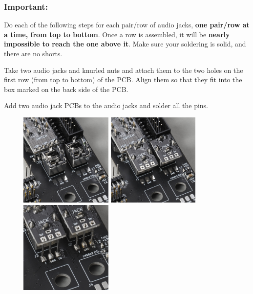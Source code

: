 \documentclass[12pt, a4paper]{article}
\begin{document}
\vspace{-5mm}
{
    \color{red}
    \subsubsection*{Important:}
    \vspace{-3mm}
    Do each of the following steps for each pair/row of audio jacks, \textbf{one pair/row at a
    time, from top to bottom}. Once a row is assembled, it will be \textbf{nearly impossible
    to reach the one above it}. Make sure your soldering is solid, and there are no shorts.
    \vspace{5mm}
}

Take two audio jacks and knurled nuts and attach them to the two holes on the first row
(from top to bottom) of the PCB. Align them so that they fit into the box marked on the
back side of the PCB.

Add two audio jack PCBs to the audio jacks and solder all the pins.

\begin{figure}[H]
    \centering
    \includegraphics[width=46mm]{images/32_01_jacks_mounted.jpg}
    \hspace{2mm}
    \includegraphics[width=46mm]{images/32_02_jacks_pcbs_soldered.jpg}
    \hspace{2mm}
    \includegraphics[width=46mm]{images/32_03_jacks_wire_soldered_bottom.jpg}
\end{figure}
\end{document}
